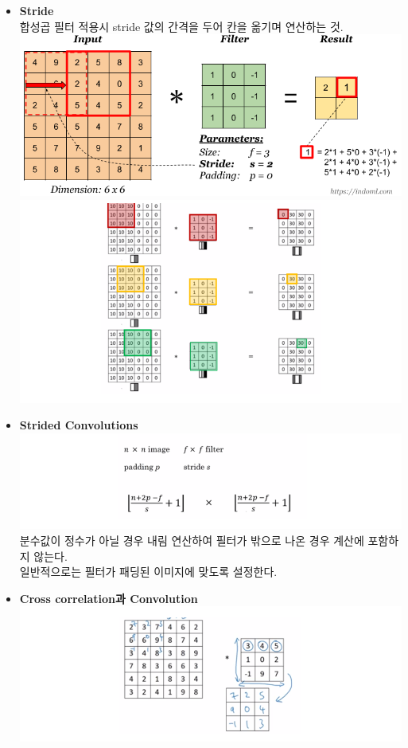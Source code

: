 \documentclass[11pt]{article}
\makeatletter
\def\maxwidth{\ifdim\Gin@nat@width>\linewidth\linewidth
    \else\Gin@nat@width\fi}
\let\Oldincludegraphics\includegraphics
\renewcommand{\includegraphics}[1]{\Oldincludegraphics[width=.8\maxwidth]{#1}}
\makeatother
\begin{document}
\begin{itemize}
\item
  \textbf{Stride}\\
  합성곱 필터 적용시 stride 값의 간격을 두어 칸을 옮기며 연산하는 것.\\
  \includegraphics{./Images/c4week1/2-0.png} \\
   \includegraphics{./Images/c4week1/2-5.png}\\
\item
  \textbf{Strided Convolutions}\\
   \includegraphics{./Images/c4week1/7-2.png}\\
   분수값이 정수가 아닐 경우 내림 연산하여 필터가 밖으로 나온 경우
  계산에 포함하지 않는다.\\
  일반적으로는 필터가 패딩된 이미지에 맞도록 설정한다. 
\item
  \textbf{Cross correlation과 Convolution}\\
  \includegraphics{./Images/c4week1/9.png}
\end{itemize}
\end{document}
